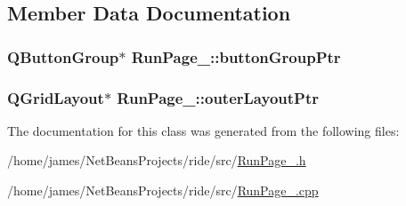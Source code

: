 \subsection{Member Data Documentation}
\hypertarget{class_run_page__1_a951be96108a118e057257ae1ea6a7b88}{
\subsubsection[{button\-Group\-Ptr}]{\setlength{\rightskip}{0pt plus 5cm}Q\-Button\-Group$\ast$ Run\-Page\-\_\-::button\-Group\-Ptr\hspace{0.3cm}{\ttfamily [private]}}}\label{class_run_page__1_a951be96108a118e057257ae1ea6a7b88}
\hypertarget{class_run_page__1_a28dd1443caf175454399a1f47c719a2a}{
\subsubsection[{outer\-Layout\-Ptr}]{\setlength{\rightskip}{0pt plus 5cm}Q\-Grid\-Layout$\ast$ Run\-Page\-\_\-::outer\-Layout\-Ptr\hspace{0.3cm}{\ttfamily [private]}}}\label{class_run_page__1_a28dd1443caf175454399a1f47c719a2a}


The documentation for this class was generated from the following files\-:\begin{DoxyCompactItemize}
\item 
/home/james/\-Net\-Beans\-Projects/ride/src/\hyperlink{_run_page__1_8h}{Run\-Page\-\_.\-h}\item 
/home/james/\-Net\-Beans\-Projects/ride/src/\hyperlink{_run_page__1_8cpp}{Run\-Page\-\_.\-cpp}\end{DoxyCompactItemize}
